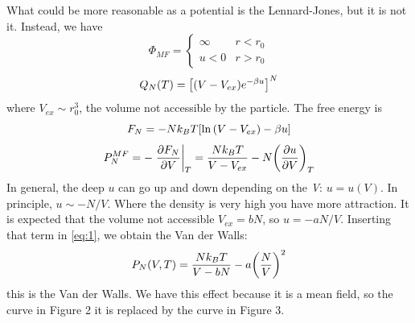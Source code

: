 \documentclass[../main/main.tex]{subfiles}
\begin{document}
 What could be more reasonable as a potential is the Lennard-Jones, but it is not it.
Instead, we have
\begin{equation}
\Phi _{MF} =
  \begin{cases}
   \infty & r < r_0\\
   u < 0 & r> r_0
  \end{cases}
\end{equation}
\begin{equation}
  Q_N (T) = \qty[ (V-V_{ex})e^{-\beta u} ]^N
\end{equation}
where \( V_{ex} \sim r_0^3 \), the volume not accessible by the particle. The free energy is
\begin{equation}
  F_N = - N k_B T \qty[ \ln{(V-V_{ex})} - \beta u ]
\end{equation}
\begin{equation}
  P_N^{MF} = - \eval{\pdv{F_N}{V} }_T = \frac{N k_B T}{V-V_{ex}} - N \qty(\pdv{u}{V} )_T
  \label{eq:1}
\end{equation}
In general, the deep \( u \)  can go up and down depending on the \emph{V}: \( u = u (V) \). In principle, \( u \sim -N/V \). Where the density is very high you have more attraction.
It is expected that the volume not accessible \( V_{ex} = b N \), so \( u = - a N / V \). Inserting that term in \eqref{eq:1}, we obtain the Van der Walls:
\begin{equation}
  P_N (V,T) = \frac{N k_B T}{V-bN} - a \qty(\frac{N}{V})^2
  \label{eq:2}
\end{equation}
this is the Van der Walls. We have this effect because it is a mean field, so the curve in Figure 2 it is replaced by the curve in Figure 3.
\end{document}
